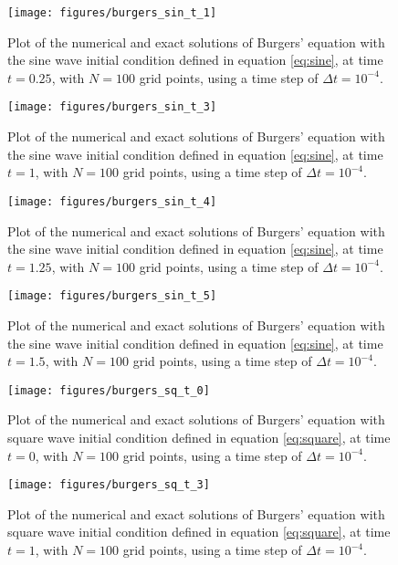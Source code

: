 
\newcommand{\labelplotthree}[3]{Plot of the numerical and exact solutions of Burgers' equation with the sine wave initial condition defined in equation \eqref{eq:sine}, at time $t=#1$, with $N=#2$ grid points, using a time step of $\Delta t =$#3.}
\begin{figure}[ht!]
	\centering
    \texttt{[image: figures/burgers\_sin\_t\_1]}
    \caption{\labelplotthree{0.25}{100}{$10^{-4}$}}
    \label{fig:burgers_sin_t_0}
\end{figure}

\begin{figure}[ht!]
	\centering
    \texttt{[image: figures/burgers\_sin\_t\_3]}
    \caption{\labelplotthree{1}{100}{$10^{-4}$}}
    \label{fig:burgers_sin_t_1}
\end{figure}

\begin{figure}[ht!]
	\centering
    \texttt{[image: figures/burgers\_sin\_t\_4]}
    \caption{\labelplotthree{1.25}{100}{$10^{-4}$}}
    \label{fig:burgers_sin_t_2}
\end{figure}

\begin{figure}[ht!]
	\centering
    \texttt{[image: figures/burgers\_sin\_t\_5]}
    \caption{\labelplotthree{1.5}{100}{$10^{-4}$}}
    \label{fig:burgers_sin_t_3}
\end{figure}


\newcommand{\labelplotfour}[3]{Plot of the numerical and exact solutions of Burgers' equation with square wave initial condition defined in equation \eqref{eq:square}, at time $t=#1$, with $N=#2$ grid points, using a time step of $\Delta t =$#3.}

\begin{figure}[ht!]
	\centering
    \texttt{[image: figures/burgers\_sq\_t\_0]}
    \caption{\labelplotfour{0}{100}{$10^{-4}$}}
    \label{fig:burgers_sq_t_0}
\end{figure}

\begin{figure}[ht!]
	\centering
    \texttt{[image: figures/burgers\_sq\_t\_3]}
    \caption{\labelplotfour{1}{100}{$10^{-4}$}}
    \label{fig:burgers_sq_t_1}
\end{figure}

